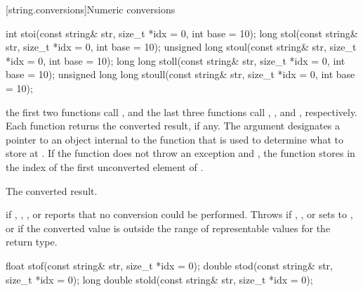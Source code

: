 \begin{itemdescr}
\pnum
\returns
{}
\end{itemdescr}

[string.conversions]{Numeric conversions}

%
%
%
%
%
\begin{itemdecl}
int stoi(const string& str, size_t *idx = 0, int base = 10);
long stol(const string& str, size_t *idx = 0, int base = 10);
unsigned long stoul(const string& str, size_t *idx = 0, int base = 10);
long long stoll(const string& str, size_t *idx = 0, int base = 10);
unsigned long long stoull(const string& str, size_t *idx = 0, int base = 10);
\end{itemdecl}

\begin{itemdescr}
\pnum
\effects the first two functions call ,
and the last three functions call ,
, and , respectively. Each function returns the converted result, if any. The
argument  designates a pointer to an object internal to the function
that is used to determine what to store at . If the function does
not throw an exception and , the function stores in 
the index of the first unconverted element of .

\pnum
\returns The converted result.

\pnum
\throws {} if , ,
, or  reports that no conversion could be
performed. Throws  if , ,
 or  sets  to ,
or if the converted value is outside the range of representable values
for the return type.
\end{itemdescr}

%
%
%
\begin{itemdecl}
float stof(const string& str, size_t *idx = 0);
double stod(const string& str, size_t *idx = 0);
long double stold(const string& str, size_t *idx = 0);
\end{itemdecl}

